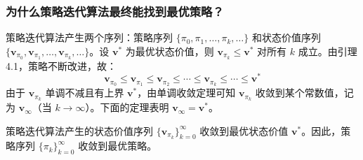 \documentclass[UTF8]{article}
\begin{document}
\subsubsection*{为什么策略迭代算法最终能找到最优策略？}

策略迭代算法产生两个序列：策略序列 $\{\pi_0, \pi_1, \dots, \pi_k, \dots\}$ 和状态价值序列 $\{\boldsymbol{v}_{\pi_0}, \boldsymbol{v}_{\pi_1}, \dots, \boldsymbol{v}_{\pi_k}, \dots\}$。设 $\boldsymbol{v}^*$ 为最优状态价值，则 $\boldsymbol{v}_{\pi_k} \leq \boldsymbol{v}^*$ 对所有 $k$ 成立。由引理4.1，策略不断改进，故：
\[
\boldsymbol{v}_{\pi_0} \leq \boldsymbol{v}_{\pi_1} \leq \boldsymbol{v}_{\pi_2} \leq \cdots \leq \boldsymbol{v}_{\pi_k} \leq \cdots \leq \boldsymbol{v}^*
\]
由于 $\boldsymbol{v}_{\pi_k}$ 单调不减且有上界 $\boldsymbol{v}^*$，由单调收敛定理可知 $\boldsymbol{v}_{\pi_k}$ 收敛到某个常数值，记为 $\boldsymbol{v}_\infty$（当 $k \to \infty$）。下面的定理表明 $\boldsymbol{v}_\infty = \boldsymbol{v}^*$。

\begin{theorembox}[4.2 策略迭代的收敛性]
    策略迭代算法产生的状态价值序列 $\{\boldsymbol{v}_{\pi_k}\}_{k=0}^{\infty}$ 收敛到最优状态价值 $\boldsymbol{v}^*$。因此，策略序列 $\{\pi_k\}_{k=0}^{\infty}$ 收敛到最优策略。
\end{theorembox}
\end{document}
